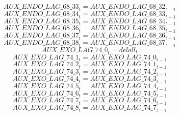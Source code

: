 \begin{dmath}
{AUX\_ENDO\_LAG\_68\_33}_{t}={AUX\_ENDO\_LAG\_68\_32}_{t-1}
\end{dmath}
\begin{dmath}
{AUX\_ENDO\_LAG\_68\_34}_{t}={AUX\_ENDO\_LAG\_68\_33}_{t-1}
\end{dmath}
\begin{dmath}
{AUX\_ENDO\_LAG\_68\_35}_{t}={AUX\_ENDO\_LAG\_68\_34}_{t-1}
\end{dmath}
\begin{dmath}
{AUX\_ENDO\_LAG\_68\_36}_{t}={AUX\_ENDO\_LAG\_68\_35}_{t-1}
\end{dmath}
\begin{dmath}
{AUX\_ENDO\_LAG\_68\_37}_{t}={AUX\_ENDO\_LAG\_68\_36}_{t-1}
\end{dmath}
\begin{dmath}
{AUX\_ENDO\_LAG\_68\_38}_{t}={AUX\_ENDO\_LAG\_68\_37}_{t-1}
\end{dmath}
\begin{dmath}
{AUX\_EXO\_LAG\_74\_0}_{t}={delall}_{t}
\end{dmath}
\begin{dmath}
{AUX\_EXO\_LAG\_74\_1}_{t}={AUX\_EXO\_LAG\_74\_0}_{t-1}
\end{dmath}
\begin{dmath}
{AUX\_EXO\_LAG\_74\_2}_{t}={AUX\_EXO\_LAG\_74\_1}_{t-1}
\end{dmath}
\begin{dmath}
{AUX\_EXO\_LAG\_74\_3}_{t}={AUX\_EXO\_LAG\_74\_2}_{t-1}
\end{dmath}
\begin{dmath}
{AUX\_EXO\_LAG\_74\_4}_{t}={AUX\_EXO\_LAG\_74\_3}_{t-1}
\end{dmath}
\begin{dmath}
{AUX\_EXO\_LAG\_74\_5}_{t}={AUX\_EXO\_LAG\_74\_4}_{t-1}
\end{dmath}
\begin{dmath}
{AUX\_EXO\_LAG\_74\_6}_{t}={AUX\_EXO\_LAG\_74\_5}_{t-1}
\end{dmath}
\begin{dmath}
{AUX\_EXO\_LAG\_74\_7}_{t}={AUX\_EXO\_LAG\_74\_6}_{t-1}
\end{dmath}
\begin{dmath}
{AUX\_EXO\_LAG\_74\_8}_{t}={AUX\_EXO\_LAG\_74\_7}_{t-1}
\end{dmath}
